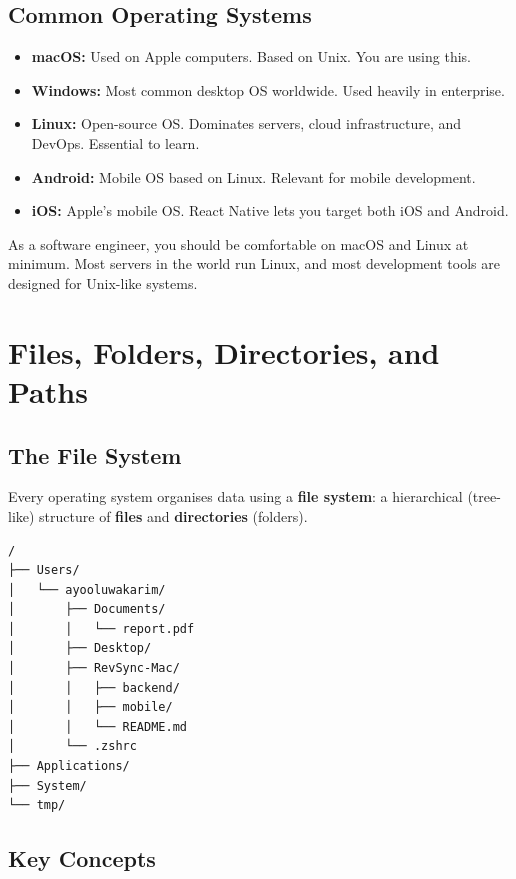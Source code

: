 \documentclass[12pt, a4paper, oneside]{book}
\begin{document}
\subsection{Common Operating Systems}

\begin{itemize}[leftmargin=2em]
    \item \textbf{macOS:} Used on Apple computers. Based on Unix. You are using this.
    \item \textbf{Windows:} Most common desktop OS worldwide. Used heavily in enterprise.
    \item \textbf{Linux:} Open-source OS. Dominates servers, cloud infrastructure, and DevOps. Essential to learn.
    \item \textbf{Android:} Mobile OS based on Linux. Relevant for mobile development.
    \item \textbf{iOS:} Apple's mobile OS. React Native lets you target both iOS and Android.
\end{itemize}

\begin{tipbox}
As a software engineer, you should be comfortable on macOS and Linux at minimum. Most servers in the world run Linux, and most development tools are designed for Unix-like systems.
\end{tipbox}

\section{Files, Folders, Directories, and Paths}

\subsection{The File System}

Every operating system organises data using a \textbf{file system}: a hierarchical (tree-like) structure of \textbf{files} and \textbf{directories} (folders).

\begin{verbatim}
/
├── Users/
│   └── ayooluwakarim/
│       ├── Documents/
│       │   └── report.pdf
│       ├── Desktop/
│       ├── RevSync-Mac/
│       │   ├── backend/
│       │   ├── mobile/
│       │   └── README.md
│       └── .zshrc
├── Applications/
├── System/
└── tmp/
\end{verbatim}

\subsection{Key Concepts}
\end{document}
